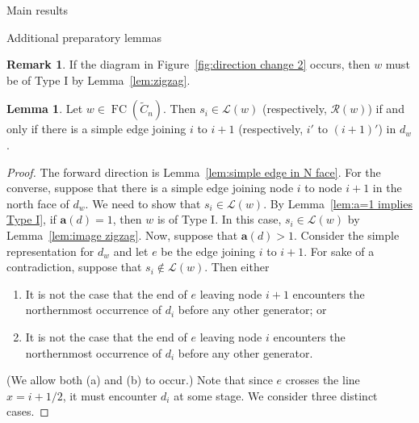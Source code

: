 \documentclass[11pt]{amsart}
\theoremstyle{definition}
\newtheorem{lemma}[theorem]{Lemma}
\newtheorem{remark}[theorem]{Remark}
\numberwithin{equation}{section}
\newcommand{\C}{\widetilde{C}}
\renewcommand{\a}{\mathbf{a}}
\renewcommand{\L}{\mathcal{L}}
\newcommand{\R}{\mathcal{R}}
\renewcommand{\(}{\left(}
\renewcommand{\)}{\right)}
\DeclareMathOperator{\FC}{FC}
\begin{document}
\begin{section}{Main results}
\begin{subsection}{Additional preparatory lemmas}
\begin{remark}\label{rem:direction change}
If the diagram in Figure~\ref{fig:direction change 2} occurs, then $w$ must be of Type I by Lemma~\ref{lem:zigzag}.  
\end{remark}

\begin{lemma}\label{lem:diagram descent set}
Let $w \in \FC(\C_{n})$.  Then $s_{i} \in \L(w)$ (respectively, $\R(w)$) if and only if there is a simple edge joining $i$ to $i+1$ (respectively, $i'$ to $(i+1)'$) in $d_{w}$.
\end{lemma}

\begin{proof}
The forward direction is Lemma~\ref{lem:simple edge in N face}. For the converse, suppose that there is a simple edge joining node $i$ to node $i+1$ in the north face of $d_{w}$.  We need to show that $s_{i} \in \L(w)$.  By Lemma~\ref{lem:a=1 implies Type I}, if $\a(d)=1$, then $w$ is of Type I.  In this case, $s_{i} \in \L(w)$ by Lemma~\ref{lem:image zigzag}.  Now, suppose that $\a(d)>1$.  Consider the simple representation for $d_{w}$ and let $e$ be the edge joining $i$ to $i+1$.  For sake of a contradiction, suppose  that $s_{i} \notin \L(w)$.  Then either 
\begin{enumerate}[label=\rm{(\alph*)}]
\item It is not the case that the end of $e$ leaving node $i+1$ encounters the northernmost occurrence of $d_{i}$ before any other generator; or
\item It is not the case that the end of $e$ leaving node $i$ encounters the northernmost occurrence of $d_{i}$ before any other generator.
\end{enumerate}
(We allow both (a) and (b) to occur.) Note that since $e$ crosses the line $x=i+1/2$, it must encounter $d_{i}$ at some stage.  We consider three distinct cases.


\end{proof}
\end{subsection}
\end{section}
\end{document}
